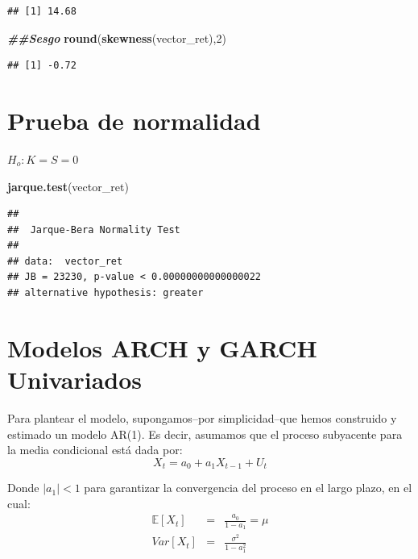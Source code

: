 \documentclass[
]{book}
\newenvironment{Shaded}{\begin{snugshade}}{\end{snugshade}}
\newcommand{\DecValTok}[1]{\textcolor[rgb]{0.00,0.00,0.81}{#1}}
\newcommand{\DocumentationTok}[1]{\textcolor[rgb]{0.56,0.35,0.01}{\textbf{\textit{#1}}}}
\newcommand{\FunctionTok}[1]{\textcolor[rgb]{0.13,0.29,0.53}{\textbf{#1}}}
\newcommand{\NormalTok}[1]{#1}
\begin{document}
\begin{verbatim}
## [1] 14.68
\end{verbatim}

\begin{Shaded}
\begin{Highlighting}[]
\DocumentationTok{\#\#Sesgo}
\FunctionTok{round}\NormalTok{(}\FunctionTok{skewness}\NormalTok{(vector\_ret),}\DecValTok{2}\NormalTok{)}
\end{Highlighting}
\end{Shaded}

\begin{verbatim}
## [1] -0.72
\end{verbatim}

\hypertarget{prueba-de-normalidad}{%
\section{Prueba de normalidad}\label{prueba-de-normalidad}}

\(H_o: K=S=0\)

\begin{Shaded}
\begin{Highlighting}[]
\FunctionTok{jarque.test}\NormalTok{(vector\_ret)}
\end{Highlighting}
\end{Shaded}

\begin{verbatim}
## 
##  Jarque-Bera Normality Test
## 
## data:  vector_ret
## JB = 23230, p-value < 0.00000000000000022
## alternative hypothesis: greater
\end{verbatim}

\hypertarget{modelos-arch-y-garch-univariados}{%
\section{Modelos ARCH y GARCH Univariados}\label{modelos-arch-y-garch-univariados}}

Para plantear el modelo, supongamos--por simplicidad--que hemos construido y estimado un modelo AR(1). Es decir, asumamos que el proceso subyacente para la media condicional está dada por:
\begin{equation}
    X_t = a_0 + a_1 X_{t-1} + U_t
\end{equation}

Donde \(| a_1 |< 1\) para garantizar la convergencia del proceso en el largo plazo, en el cual:
\begin{eqnarray*}
    \mathbb{E}[X_t] & = & \frac{a_0 }{1 - a_1} = \mu \\
    Var[X_t] & = & \frac{\sigma^2}{1 - a_1^2}
\end{eqnarray*}
\end{document}
